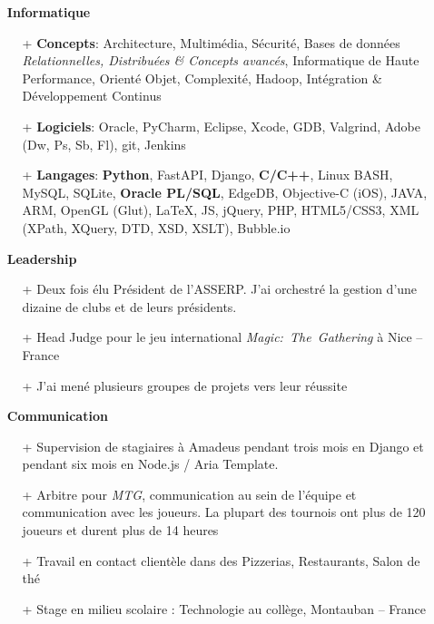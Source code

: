 \documentclass{res}
\begin{document}
\begin{resume}
	\begin{itemize}
	\item[] \faLaptopCode~\textbf{Informatique}
		\begin{itemize}
                  \item[+] \textbf{Concepts}: Architecture, Multim\'edia, S\'ecurit\'e, Bases de donn\'ees \textit{Relationnelles, Distribu\'ees \& Concepts avanc\'es}, Informatique de Haute Performance, Orient\'e Objet, Complexit\'e, Hadoop, Int\'egration \& D\'eveloppement Continus
                  \item[+] \textbf{Logiciels}: Oracle, PyCharm, Eclipse, Xcode, GDB, Valgrind, Adobe (Dw, Ps, Sb, Fl), git, Jenkins
                  \item[+] \textbf{Langages}: \textbf{Python}, FastAPI, Django, \textbf{C/C++}, Linux BASH, MySQL, SQLite, \textbf{Oracle PL/SQL}, EdgeDB, Objective-C (iOS), JAVA, ARM, OpenGL (Glut), \LaTeX{}, JS, jQuery, PHP, HTML5/CSS3, XML (XPath, XQuery, DTD, XSD, XSLT), Bubble.io
		\end{itemize}    
	\end{itemize}

	\begin{itemize}
	\item[] \faHandshake[regular]~\textbf{Leadership}
		\begin{itemize}
			      \item[+] Deux fois \'elu Pr\'esident de l'ASSERP. J'ai orchestr\'e la gestion d'une dizaine de clubs et de leurs pr\'esidents.
                  \item[+] Head Judge pour le jeu international \textit{Magic:~The~Gathering} \`a Nice -- France
                  \item[+] J'ai men\'e plusieurs groupes de projets vers leur r\'eussite
		\end{itemize}   
	\end{itemize}
	
	\begin{itemize}
	\item[] \faComments[regular]~\textbf{Communication}
		\begin{itemize}
									\item[+] Supervision de stagiaires \`a Amadeus pendant trois mois en Django et pendant six mois en Node.js / Aria Template.
                  \item[+] Arbitre pour \textit{MTG}, communication au sein de l'\'equipe et communication avec les joueurs. La plupart des tournois ont plus de 120 joueurs et durent plus de 14 heures
                  \item[+] Travail en contact client\`ele dans des Pizzerias, Restaurants, Salon de th\'e
                  \item[+] Stage en milieu scolaire : Technologie au coll\`ege, Montauban -- France


\end{itemize}
\end{itemize}
\end{resume}
\end{document}
